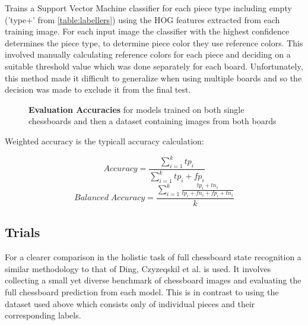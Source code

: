 \cite{} Trains a Support Vector Machine classifier for each piece type including empty ('type+' from \autoref{table:labellers}) using the HOG features extracted 
from each training image.  For each input image the classifier with the highest confidence determines the piece type, to determine piece color they use reference colors.
This involved manually calculating reference colors for each piece and deciding on a suitable threshold value which was done separately for each board.  Unfortunately,
this method made it difficult to generalize when using multiple boards and so the decision was made to exclude it from the final test.

\begin{figure}[h]
\caption{\textbf{Evaluation Accuracies} for models trained on both single chessboards and then a dataset containing images from both boards}
\label{table:results}
\end{figure}

Weighted accuracy is the typicall accuracy calculation:

\begin{equation}
    Accuracy = \frac{ \sum_{i=1}^{k}{tp_i} }{ \sum_{i=1}^{k}{tp_i + fp_i} }
\end{equation}
\begin{equation}
    Balanced\;Accuracy = \frac{\sum_{i=1}^{k}{ \frac{tp_i+tn_i}{tp_i+fn_i+fp_i+tn_i}} }{k}
\end{equation}

\subsection{Trials}
For a clearer comparison in the holistic task of full chessboard state recognition a similar methodology 
to that of Ding, Czyzeqskil et al. \cite{Ding2016ChessVisionC, heatmap} is used.  It involves collecting a small yet diverse benchmark of chessboard images
and evaluating the full chessboard prediction from each model.  This is in contrast to using the dataset used above which consists only of individual 
pieces and their corresponding labels.


